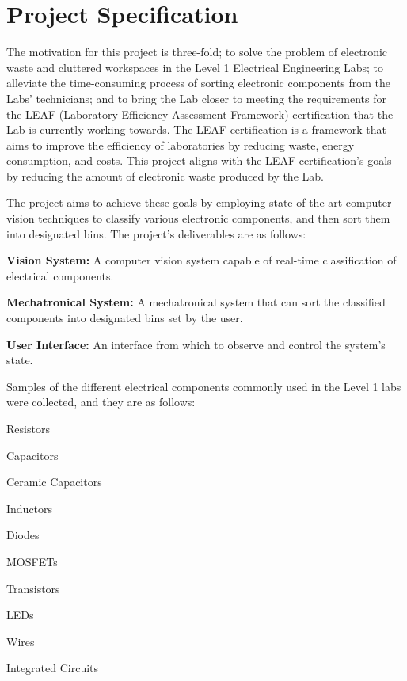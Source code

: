 \section{Project Specification}
\label{sec:project-specification}
The motivation for this project is three-fold; to solve the problem of electronic waste and cluttered workspaces in the Level 1 Electrical Engineering Labs; to alleviate the time-consuming process of sorting electronic components from the Labs' technicians; and to bring the Lab closer to meeting the requirements for the LEAF (Laboratory Efficiency Assessment Framework) certification \cite{leaf} that the Lab is currently working towards. The LEAF certification is a framework that aims to improve the efficiency of laboratories by reducing waste, energy consumption, and costs.
This project aligns with the LEAF certification's goals by reducing the amount of electronic waste produced by the Lab.

The project aims to achieve these goals by employing state-of-the-art computer vision techniques to classify various electronic components,
and then sort them into designated bins. The project's deliverables are as follows:
\begin{mylist}
  \item \textbf{Vision System:} A computer vision system capable of real-time classification of electrical components.
  \item \textbf{Mechatronical System:} A mechatronical system that can sort the classified components into designated bins set by the user.
  \item \textbf{User Interface:} An interface from which to observe and control the system's state.  
\end{mylist} 
\noindent
Samples of the different electrical components commonly used in the Level 1 labs were collected, and they are as follows:
\begin{multicols}{2}
  \begin{mylist}
    \item Resistors
    \item Capacitors
    \item Ceramic Capacitors
    \item Inductors
    \item Diodes
    \item MOSFETs
    \item Transistors
    \item LEDs
    \item Wires
    \item Integrated Circuits
  \end{mylist}
\end{multicols}

